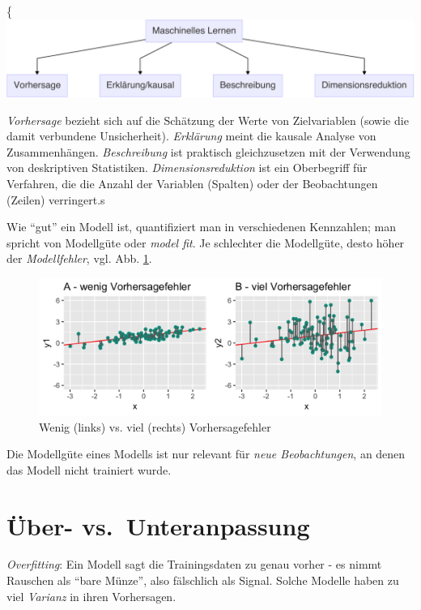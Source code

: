 \documentclass[
]{book}
\begin{document}
\{\centering \includegraphics[width=0.7\linewidth]{chunk-img/ziele-1}

\emph{Vorhersage} bezieht sich auf die Schätzung der Werte von Zielvariablen (sowie die damit verbundene Unsicherheit).
\emph{Erklärung} meint die kausale Analyse von Zusammenhängen.
\emph{Beschreibung} ist praktisch gleichzusetzen mit der Verwendung von deskriptiven Statistiken.
\emph{Dimensionsreduktion} ist ein Oberbegriff für Verfahren, die die Anzahl der Variablen (Spalten) oder der Beobachtungen (Zeilen) verringert.s

Wie ``gut'' ein Modell ist, quantifiziert man in verschiedenen Kennzahlen; man spricht von Modellgüte oder \emph{model fit}.
Je schlechter die Modellgüte, desto höher der \emph{Modellfehler}, vgl. Abb. \ref{fig:resid}.

\begin{figure}[H]

{\centering \includegraphics[width=0.7\linewidth]{img/resids-plot-1} 

}

\caption{Wenig (links) vs. viel (rechts) Vorhersagefehler}\label{fig:resid}
\end{figure}

Die Modellgüte eines Modells ist nur relevant für \emph{neue Beobachtungen},
an denen das Modell nicht trainiert wurde.

\hypertarget{uxfcber--vs.-unteranpassung}{%
\section{Über- vs.~Unteranpassung}\label{uxfcber--vs.-unteranpassung}}

\emph{Overfitting}: Ein Modell sagt die Trainingsdaten zu genau vorher - es nimmt Rauschen als ``bare Münze'', also fälschlich als Signal. Solche Modelle haben zu viel \emph{Varianz} in ihren Vorhersagen.
\end{document}
